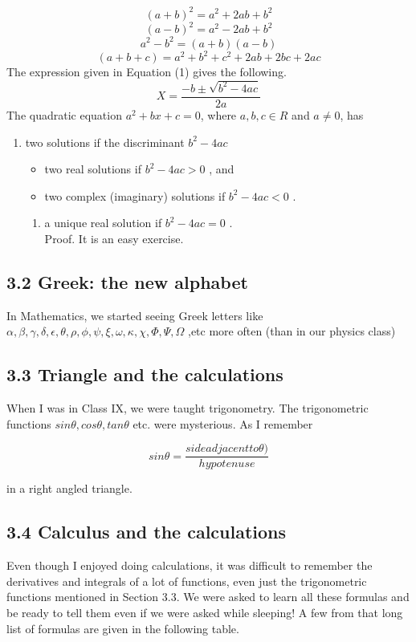 \documentclass[12pt, a4paper]{article}
\begin{document}
   $$  (a + b)^2 = a^2 + 2ab + b^2 $$ 
    $$     (a - b)^2 = a^2 - 2ab + b^2  $$
  $$  a^2 - b^2 = ( a + b )( a - b ) $$
   $$  ( a + b + c ) =  a^2  + b^2 + c^2 + 2ab + 2bc + 2ac $$
The expression given in Equation (1) gives the following. 
\begin{equation}
    X =\frac{-b\pm\sqrt{b^2-4ac}}{2a}
\end{equation}
The quadratic equation \(a^2 + bx + c = 0\), where \(a,b,c \in R\) and \(a \neq 0\), has
\begin{enumerate}
    \item two solutions if the discriminant \(b^2 - 4ac \)
    \begin{itemize}
        \item two real solutions if \(b^2 - 4ac > 0\)  , and
        \item  two complex (imaginary) solutions if \(b^2 - 4ac < 0\)  .
    \end{itemize}
    \begin{enumerate}
        \item a unique real solution if \(b^2 - 4ac = 0\) . \\
         Proof. It is an easy exercise.
    \end{enumerate}
\end{enumerate}        
\subsection*{ 3.2  Greek: the new alphabet}
 In Mathematics, we started seeing Greek letters like 
 \(\alpha, \beta , \gamma , \delta , \epsilon , \theta, \rho , \phi, \psi, \xi , \omega , \kappa, \chi, \Phi, \Psi, \Omega\)   ,etc more often (than in our physics class)
 \subsection*{3.3  Triangle and the calculations}
  When I was in Class IX, we were taught trigonometry. The trigonometric functions \(sin\theta, cos\theta, tan\theta\) etc. were mysterious. As I remember
 
$$   sin\theta = \frac{ side adjacent to \theta)}{hypotenuse} $$
  
   in a right angled triangle.
\subsection*{3.4  Calculus and the calculations}
 Even though I enjoyed doing calculations, it was difficult to remember the derivatives and integrals of a lot of functions, even just the trigonometric functions mentioned in Section 3.3. We were asked to learn all these formulas and be ready to tell them even if we were asked while sleeping! A few from that long list of formulas  are given in the following table.
 
\end{document}
